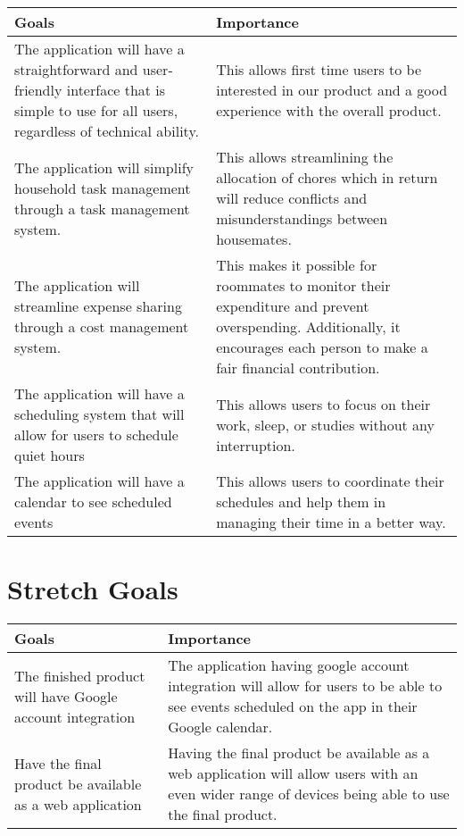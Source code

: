 \documentclass{article}
\begin{document}
\begin{center}
\begin{tabular}{|p{6cm}|p{6cm}|}
\hline
\textbf{Goals} & \textbf{Importance}\\
\hline The application will have a straightforward and user-friendly interface that is simple to use for all users, regardless of technical ability. & This allows first time users to be interested in our product and a good experience with the overall product. \\
\hline
The application will simplify household task management through a task management system. & This allows streamlining the allocation of chores which in return will reduce conflicts and misunderstandings between housemates. \\
\hline
The application will streamline expense sharing through a cost management system. & This makes it possible for roommates to monitor their expenditure and prevent overspending. Additionally, it encourages each person to make a fair financial contribution. \\
\hline
The application will have a scheduling system that will allow for users to schedule quiet hours & This allows users to focus on their work, sleep, or studies without any interruption. \\
\hline
The application will have a calendar to see scheduled events & This allows users to coordinate their schedules and help them in managing their time in a better way. \\
\hline
\end{tabular}
\end{center}



\section{Stretch Goals}

\begin{center}
\begin{tabular}{|p{6cm}|p{6cm}|}
\hline
\textbf{Goals} & \textbf{Importance}\\
\hline
The finished product will have Google account integration &  The application having google account integration will allow for users to be able to see events scheduled on the app in their Google calendar.\\
\hline
Have the final product be available as a web application & Having the final product be available as a web application will allow users with an even wider range of devices being able to use the final product. \\
\hline
\end{tabular}
\end{center}
\end{document}
